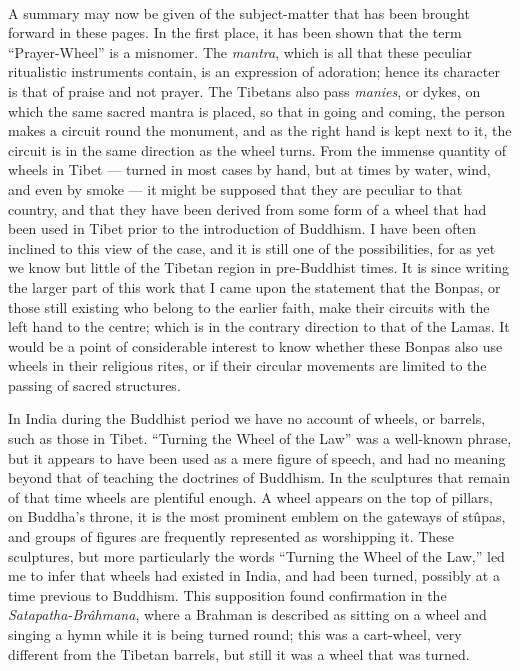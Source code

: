 \documentclass[a4paper, 11pt, oneside, polutonikogreek, english]{article}
\begin{document}
\paragraph{}
A summary may now be given of the subject-matter that has been brought forward in these pages. In the first place, it has been shown that the term ``Prayer-Wheel'' is a misnomer. The \emph{mantra}, which is all that these peculiar ritualistic instruments contain, is an expression of adoration; hence its character is that of praise and not prayer. The Tibetans also pass \emph{manies}, or dykes, on which the same sacred mantra is placed, so that in going and coming, the person makes a circuit round the monument, and as the right hand is kept next to it, the circuit is in the same direction as the wheel turns. From the immense quantity of wheels in Tibet --- turned in most cases by hand, but at times by water, wind, and even by smoke --- it might be supposed that they are peculiar to that country, and that they have been derived from some form of a wheel that had been used in Tibet prior to the introduction of Buddhism. I have been often inclined to this view of the case, and it is still one of the possibilities, for as yet we know but little of the Tibetan region in pre-Buddhist times. It is since writing the larger part of this work that I came upon the statement that the Bonpas, or those still existing who belong to the earlier faith, make their circuits with the left hand to the centre; which is in the contrary direction to that of the Lamas. It would be a point of considerable interest to know whether these Bonpas also use wheels in their religious rites, or if their circular movements are limited to the passing of sacred structures.

In India during the Buddhist period we have no account of wheels, or barrels, such as those in Tibet. ``Turning the Wheel of the Law'' was a well-known phrase, but it appears to have been used as a mere figure of speech, and had no meaning beyond that of teaching the doctrines of Buddhism. In the sculptures that remain of that time wheels are plentiful enough. A wheel appears on the top of pillars, on Buddha's throne, it is the most prominent emblem on the gateways of stûpas, and groups of figures are frequently represented as worshipping it. These sculptures, but more particularly the words ``Turning the Wheel of the Law,'' led me to infer that wheels had existed in India, and had been turned, possibly at a time previous to Buddhism. This supposition found confirmation in the \emph{Satapatha-Brâhmana}, where a Brahman is described as sitting on a wheel and singing a hymn while it is being turned round; this was a cart-wheel, very different from the Tibetan barrels, but still it was a wheel that was turned.
\end{document}
